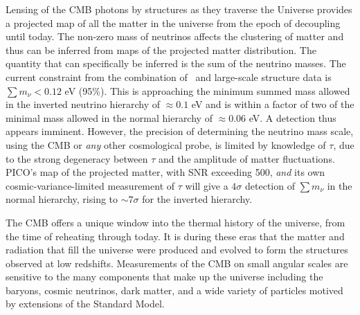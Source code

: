 \documentclass[PICOReport.tex]{subfiles}
\begin{document}
Lensing of the CMB photons by structures as they traverse the Universe provides a projected map of all the matter in the universe from the epoch of decoupling until today.  The non-zero mass of neutrinos affects the clustering of matter and thus can be inferred from maps of the projected matter distribution. The quantity that can specifically be inferred is the sum of the neutrino masses.  The current constraint from the combination of \planck\ and large-scale structure data is $\sum m_{\nu} < 0.12$ eV (95\%).  This is approaching the minimum summed mass allowed in the inverted neutrino hierarchy of $\approx 0.1$ eV and is within a factor of two of the minimal mass allowed in the normal hierarchy of $\approx 0.06$ eV.  A detection thus appears imminent.  However, the precision of determining the neutrino mass scale, using the CMB or {\it any} other cosmological probe, is limited by knowledge of $\tau$, due to the strong degeneracy between $\tau$ and the amplitude of matter fluctuations.  PICO's map of the projected matter, with \ac{SNR} exceeding 500, {\it and} its own cosmic-variance-limited measurement of $\tau$ will give a $4\sigma$ detection of $\sum m_{\nu}$ in the normal hierarchy, rising to $\sim7\sigma$ for the inverted hierarchy. 


The CMB offers a unique window into the thermal history of the universe, from the time of reheating through today.  It is during these eras that the matter and radiation that fill the universe were produced and evolved to form the structures observed at low redshifts.  Measurements of the CMB on small angular scales are sensitive to the many components that make up the universe including the baryons, cosmic neutrinos, dark matter, and a wide variety of particles motived by extensions of the Standard Model.  
\end{document}
